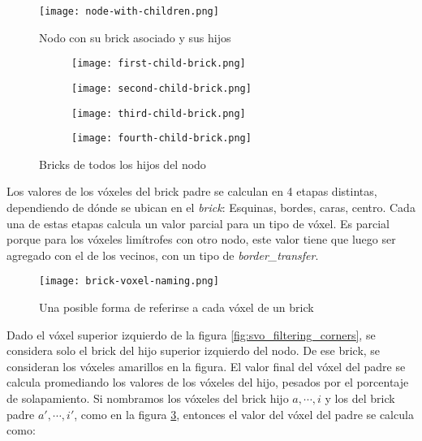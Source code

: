 \begin{figure}[h!]
    \centering
    \texttt{[image: node-with-children.png]}
    \caption{Nodo con su brick asociado y sus hijos}
    \label{fig:node_with_children}
\end{figure}

\begin{figure}[h!]
    \begin{center}
        \begin{subfigure}{.24\textwidth}
            \texttt{[image: first-child-brick.png]}
        \end{subfigure}
        \begin{subfigure}{.24\textwidth}
            \texttt{[image: second-child-brick.png]}
        \end{subfigure}
        \begin{subfigure}{.24\textwidth}
            \texttt{[image: third-child-brick.png]}
        \end{subfigure}
        \begin{subfigure}{.24\textwidth}
            \texttt{[image: fourth-child-brick.png]}
        \end{subfigure}
    \end{center}
    \caption{Bricks de todos los hijos del nodo}
    \label{fig:all_child_bricks}
\end{figure}

Los valores de los vóxeles del brick padre se calculan en 4 etapas distintas, dependiendo de dónde se ubican en el \textit{brick}: Esquinas, bordes, caras, centro.
Cada una de estas etapas calcula un valor parcial para un tipo de vóxel.
Es parcial porque para los vóxeles limítrofes con otro nodo, este valor tiene que luego ser agregado con el de los vecinos, con un tipo de \textit{border\_transfer}.


\begin{figure}
    \centering
    \texttt{[image: brick-voxel-naming.png]}
    \caption{Una posible forma de referirse a cada vóxel de un brick}
    \label{fig:brick-voxel-naming}
\end{figure}

Dado el vóxel superior izquierdo de la figura \ref{fig:svo_filtering_corners}, se considera solo el brick del hijo superior izquierdo del nodo.
De ese brick, se consideran los vóxeles amarillos en la figura.
El valor final del vóxel del padre se calcula promediando los valores de los vóxeles del hijo, pesados por el porcentaje de solapamiento.
Si nombramos los vóxeles del brick hijo $a, \cdots, i$ y los del brick padre $a', \cdots, i'$, como en la figura \ref{fig:brick-voxel-naming}, entonces el valor del vóxel del padre se calcula como:

